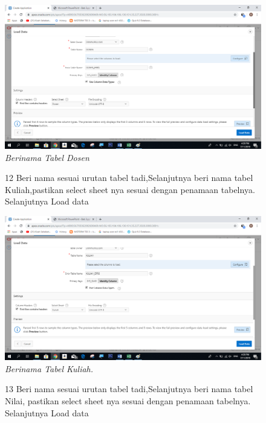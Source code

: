 \begin{enumerate}
\begin{figure}
    \begin{center}
    \includegraphics[scale=0.4]{figures/11.png}
    \caption{\textit{Berinama Tabel Dosen}}
    \end{center}
    \label{gambar}
    \end{figure}

\begin{figure}
\item[12]Beri nama sesuai urutan tabel tadi,Selanjutnya beri nama tabel Kuliah,pastikan select sheet nya sesuai dengan penamaan tabelnya. Selanjutnya Load data

    \begin{center}
    \includegraphics[scale=0.4]{figures/12.png}
    \caption{\textit{Berinama Tabel Kuliah.}}
     \end{center}
    \label{gambar}
    \end{figure}


\begin{figure}
\item[13]Beri nama sesuai urutan tabel tadi,Selanjutnya beri nama tabel Nilai, pastikan select sheet nya sesuai dengan penamaan tabelnya. Selanjutnya Load data


\end{figure}
\end{enumerate}
